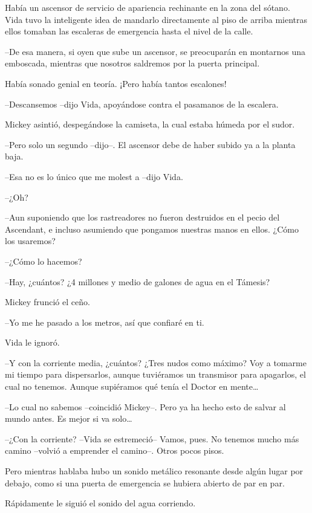 {Había un ascensor de servicio de apariencia rechinante en la zona del
 sótano. Vida tuvo la inteligente idea de mandarlo directamente al piso
 de arriba mientras ellos tomaban las escaleras de emergencia hasta el
nivel de la calle.}

{--De esa manera, si oyen que sube un ascensor, se preocuparán en
 montarnos una emboscada, mientras que nosotros saldremos por la puerta
principal.}

{Había sonado genial en teoría. ¡Pero había tantos escalones!}

{--Descansemos --dijo Vida, apoyándose contra el pasamanos de la
escalera.}

{Mickey asintió, despegándose la camiseta, la cual estaba húmeda por el
sudor.}

{--Pero solo un segundo --dijo--. El ascensor debe de haber subido ya a
la planta baja.}

{--Esa no es lo único que me molest a --dijo Vida.}

{--¿Oh?}

{--Aun suponiendo que los rastreadores no fueron destruidos en el pecio
 del Ascendant, e incluso asumiendo que pongamos nuestras manos en ellos.
¿Cómo los usaremos?}

{--¿Cómo lo hacemos?}

{--Hay, ¿cuántos? ¿4 millones y medio de galones de agua en el Támesis?}

{Mickey frunció el ceño.}

{--Yo me he pasado a los metros, así que confiaré en ti.}

{Vida le ignoró.}

{--Y con la corriente media, ¿cuántos? ¿Tres nudos como máximo? Voy a
 tomarme mi tiempo para dispersarlos, aunque tuviéramos un transmisor
 para apagarlos, el cual no tenemos. Aunque supiéramos qué tenía el
 Doctor en mente\ldots{}}

{--Lo cual no sabemos --coincidió Mickey--. Pero ya ha hecho esto de
 salvar al mundo antes. Es mejor si va solo\ldots{}}

{--¿Con la corriente? --Vida se estremeció-- Vamos, pues. No tenemos
mucho más camino --volvió a emprender el camino--. Otros pocos pisos.}

{Pero mientras hablaba hubo un sonido metálico resonante desde algún
 lugar por debajo, como si una puerta de emergencia se hubiera abierto de
par en par.}

{Rápidamente le siguió el sonido del agua corriendo.}

